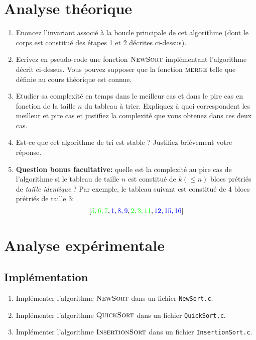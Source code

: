 \documentclass[a4paper,10pt]{article}
\begin{document}
\bigskip

\section{Analyse théorique}
\begin{enumerate}
\item Enoncez l'invariant associé à la boucle principale de cet
  algorithme (dont le corps est constitué des étapes 1 et 2 décrites
  ci-dessus).
\item Ecrivez en pseudo-code une fonction $\textnormal{\scshape NewSort}$
  implémentant l'algorithme décrit ci-dessus. Vous pouvez supposer que la fonction
  $\textnormal{\scshape merge}$ telle que définie au cours théorique est connue.
\item Etudier sa complexité en temps dans le meilleur cas et dans le
  pire cas en fonction de la taille $n$ du tableau à trier. Expliquez
  à quoi correspondent les meilleur et pire cas et justifiez la
  complexité que vous obtenez dans ces deux cas.
\item Est-ce que cet algorithme de tri est stable ? Justifiez brièvement votre réponse.
\item {\bf Question bonus facultative:} quelle est
  la complexité au pire cas de l'algorithme si le tableau de taille $n$ est
  constitué de $k (\leq n)$ blocs prétriés de {\it taille identique} ? Par exemple, le tableau
  suivant est constitué de 4 blocs prétriés de taille 3:
$$[{\color{green} 5,6,7},{\color{blue}1,8,9},{\color{green}2,3,11},{\color{blue}12,15,16}]$$
\end{enumerate}

\section{Analyse expérimentale}

\subsection{Implémentation}

\begin{enumerate}
\item Implémenter l'algorithme $\textnormal{\scshape NewSort}$ dans un fichier \texttt{NewSort.c}.
\item Implémenter l'algorithme $\textnormal{\scshape QuickSort}$ dans un fichier \texttt{QuickSort.c}.
\item Implémenter l'algorithme $\textnormal{\scshape InsertionSort}$ dans un fichier \texttt{InsertionSort.c}.
\end{enumerate}
\end{document}
